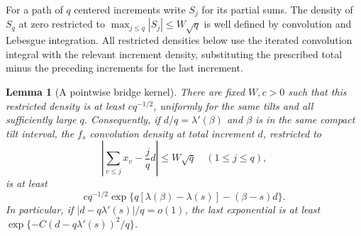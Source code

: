 \documentclass[11pt]{article}
\newtheorem{lemma}[theorem]{Lemma}
\theoremstyle{definition}\newtheorem{definition}[theorem]{Definition}
\theoremstyle{remark}\newtheorem{remark}[theorem]{Remark}
\numberwithin{equation}{section}\allowdisplaybreaks
\begin{document}
For a path of $q$ centered increments write $S_j$ for its partial sums.
The density of $S_q$ at zero restricted to
$\max_{j\le q}|S_j|\le W\sqrt q$ is well defined by convolution and
Lebesgue integration. All restricted densities below use the iterated
convolution integral with the relevant increment density, substituting
the prescribed total minus the preceding increments for the last increment.
\begin{lemma}[A pointwise bridge kernel]\label{lem:bridge}
There are fixed $W,c>0$ such that this restricted density is at least
$cq^{-1/2}$, uniformly for the same tilts and all sufficiently large $q$.
Consequently, if $d/q=\lambda'(\beta)$ and $\beta$ is in the same
compact tilt interval, the $f_s$ convolution density at total increment
$d$, restricted to
\[
 \left|\sum_{v\le j}x_v-\frac jq d\right|\le W\sqrt q
 \quad(1\le j\le q),
\]
is at least
\begin{equation}\label{eq:bridge-saddle}
 cq^{-1/2}\exp\{q[\lambda(\beta)-\lambda(s)]-(\beta-s)d\}.
\end{equation}
In particular, if $|d-q\lambda'(s)|/q=o(1)$, the last exponential is at
least $\exp\{-C(d-q\lambda'(s))^2/q\}$.
\end{lemma}
\end{document}
